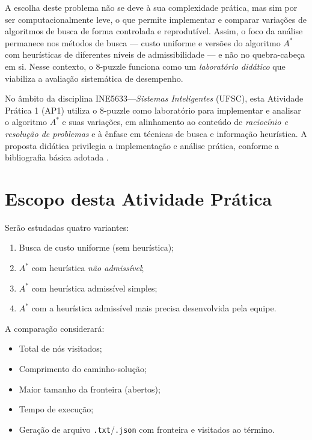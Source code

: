 A escolha deste problema não se deve à sua complexidade prática, mas sim por ser computacionalmente leve, o que permite implementar e comparar variações de algoritmos de busca de forma controlada e reprodutível. Assim, o foco da análise permanece nos métodos de busca --- custo uniforme e versões do algoritmo $A^*$ com heurísticas de diferentes níveis de admissibilidade --- e não no quebra-cabeça em si. Nesse contexto, o 8-puzzle funciona como um \emph{laboratório didático} que viabiliza a avaliação sistemática de desempenho.  
  
No âmbito da disciplina INE5633---\emph{Sistemas Inteligentes} (UFSC), esta Atividade Prática 1 (AP1) utiliza o 8-puzzle como laboratório para implementar e analisar o algoritmo $A^*$ e suas variações, em alinhamento ao conteúdo de \emph{raciocínio e resolução de problemas} e à ênfase em técnicas de busca e informação heurística. A proposta didática privilegia a implementação e análise prática, conforme a bibliografia básica adotada \cite{russell2010artificial,luger2009artificial}.  
  
\vspace{0.5cm}  
\section{Escopo desta Atividade Prática}  
  
Serão estudadas quatro variantes:  
\begin{enumerate}[label=\roman*)]  
  \item Busca de custo uniforme (sem heurística);  
  \item $A^*$ com heurística \emph{não admissível};  
  \item $A^*$ com heurística admissível simples;  
  \item $A^*$ com a heurística admissível mais precisa desenvolvida pela equipe.  
\end{enumerate}  
  
A comparação considerará:  
\begin{itemize}  
  \item Total de nós visitados;  
  \item Comprimento do caminho-solução;  
  \item Maior tamanho da fronteira (abertos);  
  \item Tempo de execução;  
  \item Geração de arquivo \texttt{.txt}/\texttt{.json} com fronteira e visitados ao término.  
\end{itemize}  
  
